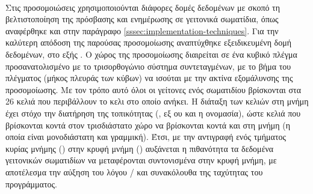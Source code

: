 \paragraph{} Στις προσομοιώσεις  χρησιμοποιούνται διάφορες δομές δεδομένων με
σκοπό τη βελτιστοποίηση της πρόσβασης και ενημέρωσης σε γειτονικά σωματίδια, όπως
αναφέρθηκε και στην παράγραφο \ref{sssec:implementation-techniques}. Για την καλύτερη
απόδοση της παρούσας προσομοίωσης αναπτύχθηκε εξειδικευμένη δομή δεδομένων, στο εξής
. Ο χώρος της προσομοίωσης διαιρείται σε ένα κυβικό πλέγμα προσανατολισμένο
με το τρισορθογώνιο σύστημα συντεταγμένων, με το βήμα του πλέγματος (μήκος πλευράς των
κύβων) να ισούται με την ακτίνα εξομάλυνσης της προσομοίωσης. Με τον τρόπο αυτό όλοι οι
γείτονες ενός σωματιδίου βρίσκονται στα 26 κελιά που περιβάλλουν το κελι στο οποίο
ανήκει. Η διάταξη των κελιών στη μνήμη έχει στόχο την διατήρηση της τοπικότητας
(, εξ ου και η ονομασία), ώστε κελιά που βρίσκονται κοντά στον
τρισδιάστατο χώρο να βρίσκονται κοντά και στη μνήμη (η οποία είναι μονοδιάστατη και
γραμμική). Έτσι, με την αντιγραφή ενός τμήματος κυρίας μνήμης () στην κρυφή μνήμη
() αυξάνεται η πιθανότητα τα δεδομένα γειτονικών σωματιδίων να μεταφέρονται
συντονισμένα στην κρυφή μνήμη, με αποτέλεσμα την αύξηση του λόγου / και
συνακόλουθα της ταχύτητας του προγράμματος.

